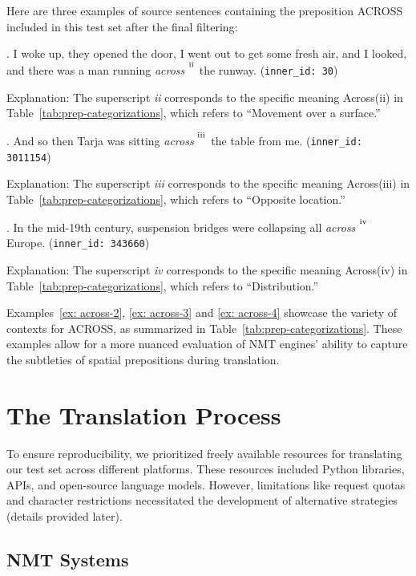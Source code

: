 Here are three examples of source sentences containing the preposition ACROSS included in this test set after the final filtering:

\ex. I woke up, they opened the door, I went out to get some fresh air, and I looked, and there was a man running \emph{across} $^{\textsuperscript{ii}}$ the runway. (\texttt{inner\_id: 30}) \label{ex: across-2}

Explanation: The superscript \emph{ii} corresponds to the specific meaning Across(ii) in Table~\ref{tab:prep-categorizations}, which refers to ``Movement over a surface.''

\ex. And so then Tarja was sitting \emph{across} $^{\textsuperscript{iii}}$ the table from me. (\texttt{inner\_id: 3011154}) \label{ex: across-3}

Explanation: The superscript \emph{iii} corresponds to the specific meaning Across(iii) in Table~\ref{tab:prep-categorizations}, which refers to ``Opposite location.''

\ex. In the mid-19th century, suspension bridges were collapsing all \emph{across} $^{\textsuperscript{iv}}$ Europe. (\texttt{inner\_id: 343660}) \label{ex: across-4}

Explanation: The superscript \emph{iv} corresponds to the specific meaning Across(iv) in Table~\ref{tab:prep-categorizations}, which refers to ``Distribution.'' 

Examples~\ref{ex: across-2}, \ref{ex: across-3} and \ref{ex: across-4} showcase the variety of contexts for ACROSS, as summarized in Table~\ref{tab:prep-categorizations}. These examples allow for a more nuanced evaluation of NMT engines' ability to capture the subtleties of spatial prepositions during translation.


\section{The Translation Process}

To ensure reproducibility, we prioritized freely available resources for translating our test set across different platforms. These resources included Python libraries, APIs, and open-source language models. However, limitations like request quotas and character restrictions necessitated the development of alternative strategies (details provided later).

\subsection{NMT Systems}

